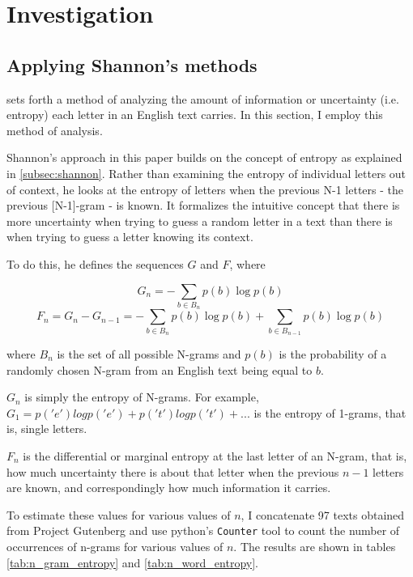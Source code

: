 \chapter{Investigation}

\section{Applying Shannon's methods}
\textcite{Shannon1951} sets forth a method of analyzing the amount of information or uncertainty (i.e. entropy) each letter in an English text carries. In this section, I employ this method of analysis.

Shannon's approach in this paper builds on the concept of entropy as explained in \ref{subsec:shannon}. Rather than examining the entropy of individual letters out of context, he looks at the entropy of letters when the previous N-1 letters - the previous [N-1]-gram - is known. It formalizes the intuitive concept that there is more uncertainty when trying to guess a random letter in a text than there is when trying to guess a letter knowing its context.

To do this, he defines the sequences $G$ and $F$, where


$$G_n = -\sum_{b \in B_n} p(b) \log p(b)$$
$$F_n = G_n - G_{n-1} = -\sum_{b \in B_n} p(b) \log p(b)+\sum_{b \in B_{n-1}} p(b) \log p(b)$$

where $B_n$ is the set of all possible N-grams and $p(b)$ is the probability of a randomly chosen N-gram from an English text being equal to $b$.

$G_n$ is simply the entropy of N-grams. For example, $G_1 = p('e') log p('e') + p('t') log p('t') + ...$ is the entropy of 1-grams, that is, single letters.

$F_n$ is the differential or marginal entropy at the last letter of an N-gram, that is, how much uncertainty there is about that letter when the previous $n-1$ letters are known, and correspondingly how much information it carries.

To estimate these values for various values of $n$, I concatenate 97 texts obtained from Project Gutenberg and use python's \texttt{Counter} tool to count the number of occurrences of n-grams for various values of $n$. The results are shown in tables \ref{tab:n_gram_entropy} and \ref{tab:n_word_entropy}.


